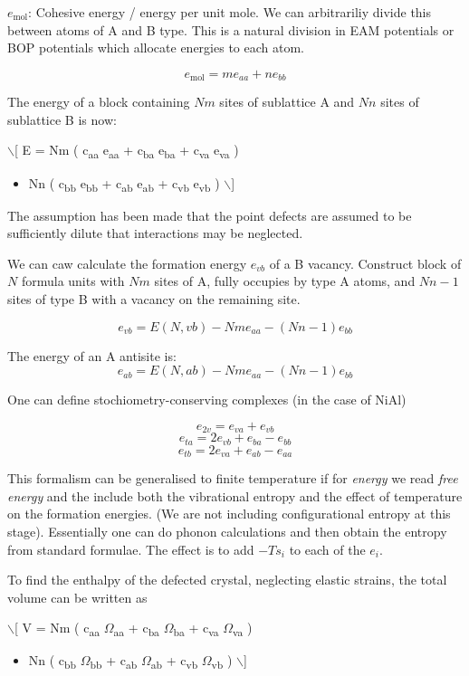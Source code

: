 \documentclass[11pt]{article}
\begin{document}
\(e_{\text{mol}}\): Cohesive energy / energy per unit mole.  
We can arbitrariliy divide this between atoms of A and B type. This is a
natural division in EAM potentials or BOP potentials which allocate energies to
each atom. 

\[ e_{\text{mol}} = m e_{aa} + n e_{bb}  \]

The energy of a block containing \(Nm\) sites of sublattice A and \(Nn\) sites of
sublattice B is now:


$\backslash$[ E = Nm ( c\textsubscript{aa} e\textsubscript{aa} + c\textsubscript{ba} e\textsubscript{ba} + c\textsubscript{va} e\textsubscript{va} ) 
\begin{itemize}
\item Nn ( c\textsubscript{bb} e\textsubscript{bb} + c\textsubscript{ab} e\textsubscript{ab} + c\textsubscript{vb} e\textsubscript{vb} ) $\backslash$]
\end{itemize}

The assumption has been made that the point defects are assumed to be
sufficiently dilute that interactions may be neglected. 

We can caw calculate the formation energy \(e_{vb}\) of a B vacancy. Construct
block of \(N\) formula units with \(Nm\) sites of A, fully occupies by type A
atoms, and \(Nn - 1\) sites of type B with a vacancy on the remaining site.

\[ e_{vb} = E(N, vb) - Nm e_{aa} - ( Nn - 1 ) e_{bb} \]

The energy of an A antisite is:
\[ e_{ab} = E(N, ab) - Nm e_{aa} - ( Nn - 1 ) e_{bb} \]

One can define stochiometry-conserving complexes (in the case of NiAl) 

\[ e_{2v} =   e_{va} + e_{vb} \]
\[ e_{ta} = 2 e_{vb} + e_{ba} - e_{bb} \]
\[ e_{tb} = 2 e_{va} + e_{ab} - e_{aa} \]

This formalism can be generalised to finite temperature if for \emph{energy} we read
\emph{free energy} and the include both the vibrational entropy and the effect of
temperature on the formation energies. (We are not including configurational
entropy at this stage). Essentially one can do phonon calculations and then
obtain the entropy from standard formulae. The effect is to add \(- Ts_i\) to
each of the \(e_i\).


To find the enthalpy of the defected crystal, neglecting elastic strains, the
total volume can be written as 

$\backslash$[ V = Nm ( c\textsubscript{aa} \(\Omega\)\textsubscript{aa} + c\textsubscript{ba} \(\Omega\)\textsubscript{ba} + c\textsubscript{va} \(\Omega\)\textsubscript{va} ) 
\begin{itemize}
\item Nn ( c\textsubscript{bb} \(\Omega\)\textsubscript{bb} + c\textsubscript{ab} \(\Omega\)\textsubscript{ab} + c\textsubscript{vb} \(\Omega\)\textsubscript{vb} ) $\backslash$]
\end{itemize}
\end{document}
